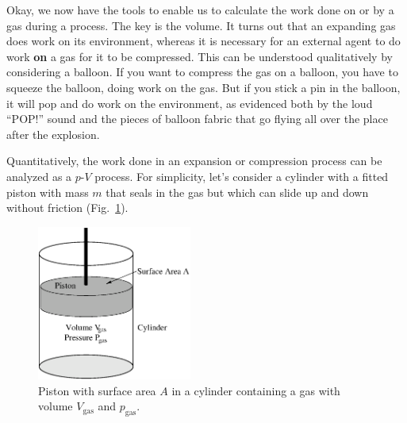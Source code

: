 Okay, we now have the tools to enable us to calculate the work done on
or by a gas during a process.  The key is the volume.  It turns out that
an expanding gas does work on its environment, whereas it is necessary
for an external agent to do work {\bf on} a gas for it to be compressed.
This can be understood qualitatively by considering a balloon.  If you
want to compress the gas on a balloon, you have to squeeze the balloon,
doing work on the gas.  But if you stick a pin in the balloon, it will pop
and do work on the environment, as evidenced both by the loud ``POP!''
sound and the pieces of balloon fabric that go flying all over the place
after the explosion.

Quantitatively, the work done in an expansion or compression process can
be analyzed as a $p$-$V$ process. For simplicity, let's consider a cylinder
with a fitted piston with mass $m$ that seals in the gas but which can
slide up and down without friction (Fig.~\ref{fig:cylinder}).

\begin{figure}
\begin{center}
\includegraphics[width=2.0in]{gas_processes/cylinder.eps}
\caption{Piston with surface area $A$ in a cylinder containing
a gas with volume $V_\text{gas}$ and $p_\text{gas}$.}
\label{fig:cylinder}
\end{center}
\label{fig:cylinder}
\end{figure}

